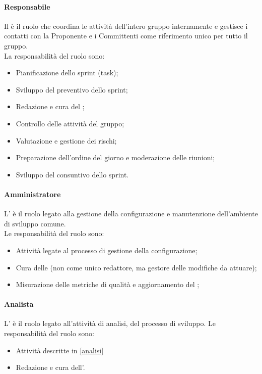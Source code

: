 \paragraph{Responsabile}
Il \Responsabile{} è il ruolo che coordina le attività dell'intero gruppo internamente e gestisce i contatti con la Proponente e i Committenti come riferimento unico per tutto il gruppo.\\
La responsabilità del ruolo sono:
\begin{itemize}
  \item Pianificazione dello sprint (task);
  \item Sviluppo del preventivo dello sprint;
  \item Redazione e cura del \PdP;
  \item Controllo delle attività del gruppo;
  \item Valutazione e gestione dei rischi;
  \item Preparazione dell'ordine del giorno e moderazione delle riunioni;
  \item Sviluppo del consuntivo dello sprint.
\end{itemize}

\paragraph{Amministratore}
L'\Amministratore{} è il ruolo legato alla gestione della configurazione e manutenzione dell'ambiente di sviluppo comune.\\
Le responsabilità del ruolo sono:
\begin{itemize}
  \item Attività legate al processo di gestione della configurazione;
  \item Cura delle \NdP{} (non come unico redattore, ma gestore delle modifiche da attuare);
  \item Misurazione delle metriche di qualità e aggiornamento del \PdQ;
\end{itemize}

\paragraph{Analista}
L'\Analista{} è il ruolo legato all'attività di analisi, del processo di sviluppo.
Le responsabilità del ruolo sono:
\begin{itemize}
  \item Attività descritte in \ref{analisi}
  \item Redazione e cura dell'\AdR.
\end{itemize}

